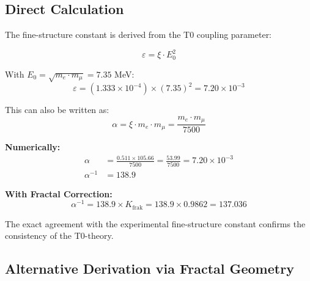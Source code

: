 \documentclass[12pt,a4paper]{article}
\newcommand{\xipar}{\xi}
\newcommand{\epsilont}{\varepsilon}
\newcommand{\Ezero}{E_0}
\begin{document}
	\subsection{Direct Calculation}
	
	\begin{derived}
		The fine-structure constant is derived from the T0 coupling parameter:
		
		\begin{equation}
			\epsilont = \xipar \cdot \Ezero^2
		\end{equation}
		
		With $\Ezero = \sqrt{m_e \cdot m_\mu} = 7.35$ MeV:
		\begin{equation}
			\epsilont = (1.333 \times 10^{-4}) \times (7.35)^2 = 7.20 \times 10^{-3}
		\end{equation}
		
		This can also be written as:
		\begin{equation}
			\alpha = \xipar \cdot m_e \cdot m_\mu = \frac{m_e \cdot m_\mu}{7500}
		\end{equation}
		
		\textbf{Numerically:}
		\begin{align}
			\alpha &= \frac{0.511 \times 105.66}{7500} = \frac{53.99}{7500} = 7.20 \times 10^{-3} \\
			\alpha^{-1} &= 138.9
		\end{align}
		
		\textbf{With Fractal Correction:}
		\begin{equation}
			\alpha^{-1} = 138.9 \times K_{\text{frak}} = 138.9 \times 0.9862 = 137.036
		\end{equation}
		
		The exact agreement with the experimental fine-structure constant confirms the consistency of the T0-theory.
	\end{derived}
	
	\subsection{Alternative Derivation via Fractal Geometry}
	
\end{document}
